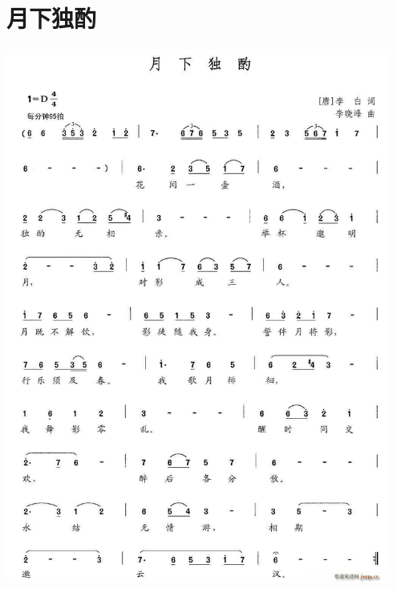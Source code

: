 \documentclass[cn,pad,twocol]{elegantbook}
\begin{document}
\section{月下独酌}  \includegraphics[width=0.95\textwidth]{dongxiao/20200808-月下独酌-李白.jpg} 
\end{document}
